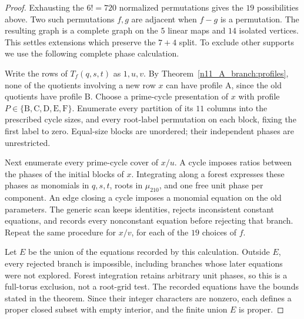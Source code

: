 \documentclass[11pt,a4paper]{article}
\theoremstyle{plain}
\theoremstyle{definition}
\theoremstyle{plain}
\begin{document}
\begin{proof}
Exhausting the $6!=720$ normalized permutations gives the $19$ possibilities above. Two such permutations $f,g$ are adjacent when $f-g$ is a permutation. The resulting graph is a complete graph on the $5$ linear maps and $14$ isolated vertices. This settles extensions which preserve the $7+4$ split. To exclude other supports we use the following complete phase calculation.

Write the rows of $T_f(q,s,t)$ as $1,u,v$. By Theorem~\ref{n11_A_branch:profiles}, none of the quotients involving a new row $x$ can have profile $\mathrm{A}$, since the old quotients have profile $\mathrm{B}$. Choose a prime-cycle presentation of $x$ with profile $P\in\{\mathrm{B},\mathrm{C},\mathrm{D},\mathrm{E},\mathrm{F}\}$. Enumerate every partition of its $11$ columns into the prescribed cycle sizes, and every root-label permutation on each block, fixing the first label to zero. Equal-size blocks are unordered; their independent phases are unrestricted.

Next enumerate every prime-cycle cover of $x/u$. A cycle imposes ratios between the phases of the initial blocks of $x$. Integrating along a forest expresses these phases as monomials in $q,s,t$, roots in $\mu_{210}$, and one free unit phase per component. An edge closing a cycle imposes a monomial equation on the old parameters. The generic scan keeps identities, rejects inconsistent constant equations, and records every nonconstant equation before rejecting that branch. Repeat the same procedure for $x/v$, for each of the $19$ choices of $f$.

Let $E$ be the union of the equations recorded by this calculation. Outside $E$, every rejected branch is impossible, including branches whose later equations were not explored. Forest integration retains arbitrary unit phases, so this is a full-torus exclusion, not a root-grid test. The recorded equations have the bounds stated in the theorem. Since their integer characters are nonzero, each defines a proper closed subset with empty interior, and the finite union $E$ is proper.


\end{proof}
\end{document}
